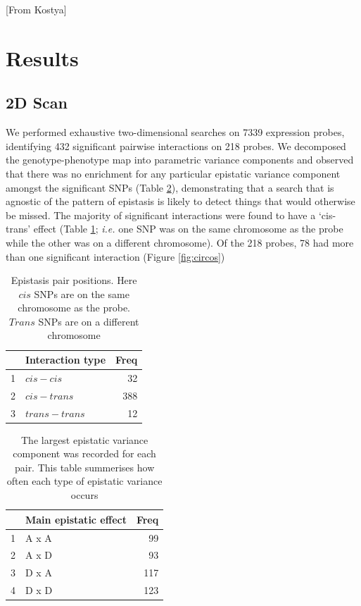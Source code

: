 \documentclass[paper=a4, fontsize=11pt]{scrartcl}	%
\numberwithin{equation}{section}									%
\numberwithin{figure}{section}										%
\numberwithin{table}{section}										%
\begin{document}
[From Kostya]

\section{Results}

\subsection{2D Scan}

We performed exhaustive two-dimensional searches on 7339 expression probes, identifying 432 significant pairwise interactions on 218 probes. We decomposed the genotype-phenotype map into parametric variance components and observed that there was no enrichment for any particular epistatic variance component amongst the significant SNPs (Table \ref{tab:vc}), demonstrating that a search that is agnostic of the pattern of epistasis is likely to detect things that would otherwise be missed. The majority of significant interactions were found to have a `cis-trans' effect (Table \ref{tab:type}; \emph{i.e.} one SNP was on the same chromosome as the probe while the other was on a different chromosome). Of the 218 probes, 78 had more than one significant interaction (Figure \ref{fig:circos})


\begin{table}[ht]
	\centering
	\begin{tabular}{rlr}
		\hline
		& Interaction type & Freq \\ 
		\hline
		1 & $cis-cis$ &  32 \\ 
		2 & $cis-trans$ & 388 \\ 
		3 & $trans-trans$ &  12 \\ 
		\hline
	\end{tabular}
	\caption{Epistasis pair positions. Here $cis$ SNPs are on the same chromosome as the probe. $Trans$ SNPs are on a different chromosome}
	\label{tab:type}
\end{table}

\begin{table}[ht]
	\centering
	\begin{tabular}{rlr}
		\hline
		& Main epistatic effect & Freq \\ 
		\hline
		1 & A x A &  99 \\ 
		2 & A x D &  93 \\ 
		3 & D x A & 117 \\ 
		4 & D x D & 123 \\ 
		\hline
	\end{tabular}
	\caption{The largest epistatic variance component was recorded for each pair. This table summerises how often each type of epistatic variance occurs}
	\label{tab:vc}
\end{table}
\end{document}

